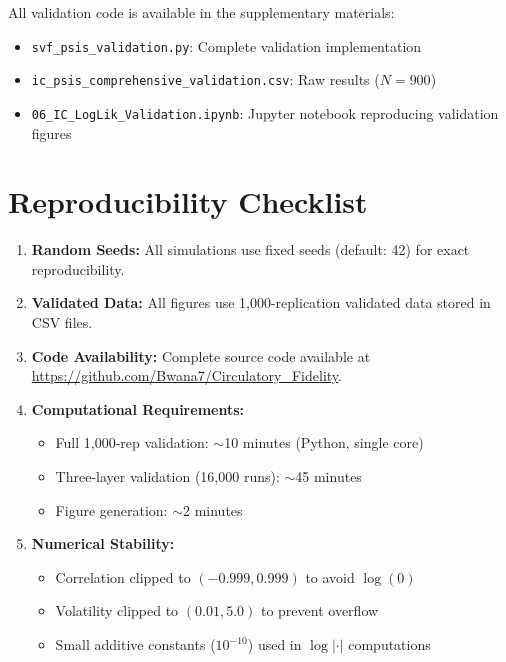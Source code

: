 \documentclass[10pt]{article} %
\theoremstyle{plain}
\theoremstyle{definition}
\begin{document}
All validation code is available in the supplementary materials:
\begin{itemize}[nosep]
    \item \texttt{svf\_psis\_validation.py}: Complete validation implementation
    \item \texttt{ic\_psis\_comprehensive\_validation.csv}: Raw results ($N = 900$)
    \item \texttt{06\_IC\_LogLik\_Validation.ipynb}: Jupyter notebook reproducing validation figures
\end{itemize}


\section{Reproducibility Checklist}
\label{app:reproducibility}

\begin{enumerate}
\item \textbf{Random Seeds:} All simulations use fixed seeds (default: 42) for exact reproducibility.

\item \textbf{Validated Data:} All figures use 1,000-replication validated data stored in CSV files.

\item \textbf{Code Availability:} Complete source code available at \url{https://github.com/Bwana7/Circulatory_Fidelity}.

\item \textbf{Computational Requirements:}
\begin{itemize}
\item Full 1,000-rep validation: $\sim$10 minutes (Python, single core)
\item Three-layer validation (16,000 runs): $\sim$45 minutes
\item Figure generation: $\sim$2 minutes
\end{itemize}

\item \textbf{Numerical Stability:}
\begin{itemize}
\item Correlation clipped to $(-0.999, 0.999)$ to avoid $\log(0)$
\item Volatility clipped to $(0.01, 5.0)$ to prevent overflow
\item Small additive constants ($10^{-10}$) used in $\log|\cdot|$ computations
\end{itemize}
\end{enumerate}


\small
\end{document}
